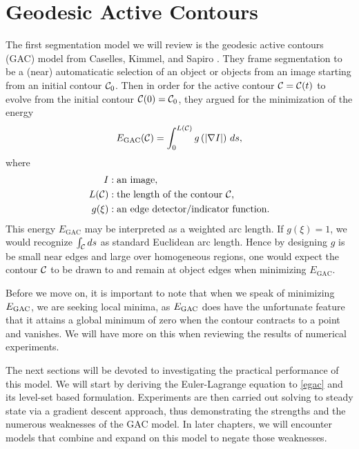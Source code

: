 \chapter{Geodesic Active Contours}
\label{ch:gac}
The first segmentation model we will review is the geodesic active contours (GAC) model from Caselles, Kimmel, and Sapiro \cite{caselles1997geodesic}. They frame segmentation to be a (near) automaticatic selection of an object or objects from an image starting from an initial contour $\mathcal{C}_0$. Then in order for the active contour $\mathcal{C} = \mathcal{C}(t)$ to evolve from the initial contour $\mathcal{C}(0) = \mathcal{C}_0$, they argued for the minimization of the energy 
\begin{align}
E_\mathrm{GAC}(\mathcal{C}) = \int^{L(\mathcal{C})}_0 g\left( \lvert\nabla I \rvert \right) \, ds,
\label{egac}
\end{align}
where 
\begin{align*}
I&: \textrm{an image},
\\
L(\mathcal{C}) &: \textrm{the length of the contour $\mathcal{C}$,} 
\\ 
g(\xi)&: \textrm{an edge detector/indicator function}.
\end{align*}
This energy $E_\textrm{GAC}$ may be interpreted as a weighted arc length. If $g(\xi) = 1$, we would recognize $\int_{\mathcal{C}}  ds$ as standard Euclidean arc length. Hence by designing $g$ is be small near edges and large over homogeneous regions, one would expect the contour $\mathcal{C}$ to be drawn to and remain at object edges when minimizing $E_\textrm{GAC}$. 

Before we move on, it is important to note that when we speak of minimizing $E_\textrm{GAC}$, we are seeking local minima, as $E_\textrm{GAC}$ does have the unfortunate feature that it attains a global minimum of zero when the contour contracts to a point and vanishes. We will have more on this when reviewing the results of numerical experiments.

The next sections will be devoted to investigating the practical performance of this model. We will start by deriving the Euler-Lagrange equation to \eqref{egac} and its level-set based formulation. Experiments are then carried out solving to steady state via a gradient descent approach, thus demonstrating the strengths and the numerous weaknesses of the GAC model. In later chapters, we will encounter models that combine and expand on this model to negate those weaknesses.


